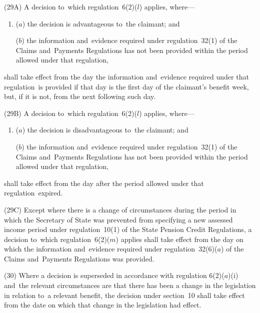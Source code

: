 \documentclass[12pt,a4paper]{article}
\begin{document}
(29A) A decision to~which regulation~6(2)($l$)  applies, where—
\begin{enumerate}\item[]
($a$) the decision is advantageous to~the claimant; and

($b$) the information and~evidence required under regulation~32(1) of the Claims and~Payments Regulations has not been provided within the period allowed under that regulation,
\end{enumerate}
shall take effect from the day the information and~evidence required under that regulation~is provided if that day is the first day of the claimant’s benefit week, but, if it is not, from the next following such day.

(29B) A decision to~which regulation~6(2)($l$)  applies, where—
\begin{enumerate}\item[]
($a$) the decision is disadvantageous to~the claimant; and

($b$) the information and~evidence required under regulation~32(1) of the Claims and~Payments Regulations has not been provided within the period allowed under that regulation,
\end{enumerate}
shall take effect from the day after the period allowed under that regulation~expired.

(29C) Except where there is a change of circumstances during the period in which the Secretary of State was prevented from specifying a new assessed income period under regulation~10(1) of the State Pension Credit Regulations, a decision to~which regulation~6(2)($m$)  applies shall take effect from the day on which the information and~evidence required under regulation~32(6)($a$)  of the Claims and~Payments Regulations was provided.

\begin{sloppypar}
(30) Where a decision is superseded in accordance with regulation 6(2)($a$)(i)  and~the relevant circumstances are that there has been a change in the legislation in relation to~a relevant benefit, the decision under section~10 shall take effect from the date on which that change in the legislation had effect.
\end{sloppypar}
\end{document}
